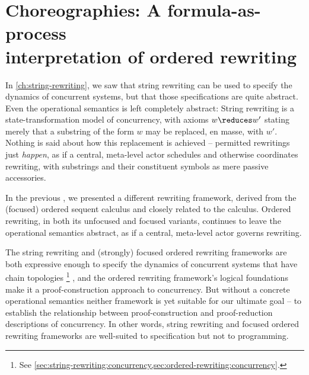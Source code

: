 \chapter[Choreographies: A formula-as-process interpretation of ordered rewriting]{Choreographies: A formula-as-process\\interpretation of ordered rewriting}\label{ch:formula-as-process}\label{ch:choreographies}



In \cref{ch:string-rewriting}, we saw that string rewriting can be used to specify the dynamics of concurrent systems, but that those specifications are quite abstract.
Even the operational semantics is left completely abstract:
String rewriting is a state-transformation model of concurrency, with axioms $w \reduces w'$
stating merely that a substring of the form $w$ may be replaced, en masse, with $w'$.
Nothing is said about how this replacement is achieved -- permitted rewritings just \emph{happen}, as if a central, meta-level actor schedules and otherwise coordinates rewriting, with substrings and their constituent symbols as mere passive accessories.

In the previous , we presented a different rewriting framework, derived from the (focused) ordered sequent calculus and closely related to the \citeauthor{Lambek:AMM58} calculus\autocite{Lambek:AMM58}.
Ordered rewriting, in both its unfocused and focused variants, continues to leave the operational semantics abstract, as if a central, meta-level actor governs rewriting.

The string rewriting and (strongly) focused ordered rewriting frameworks are both expressive enough to specify the dynamics of concurrent systems that have chain topologies%
\footnote{See \cref{sec:string-rewriting:concurrency,sec:ordered-rewriting:concurrency}.}%
, and the ordered rewriting framework's logical foundations make it a proof-construction approach to concurrency.
But without a concrete operational semantics neither framework is yet suitable for our ultimate goal -- 
to establish the relationship between proof-construction and proof-reduction descriptions of concurrency.
In other words, string rewriting and focused ordered rewriting frameworks are well-suited to specification but not to programming.

